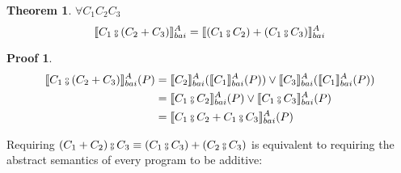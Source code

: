 \documentclass{article}
\newtheorem{theorem}{Theorem}
\newtheorem{proofs}{Proof}
\newcommand*{\sem}[1]{
    \llbracket #1 \rrbracket
}
\newcommand{\bca}[2]{
    #2_{bai}^{#1}
}
\newcommand{\bsem}[2][A]{
    \bca{#1}{\sem{#2}}
}
\def\fcmp{\mathbin{\raise 0.6ex\hbox{\oalign{\hfil$\scriptscriptstyle      
    \mathrm{o}$\hfil\cr\hfil$\scriptscriptstyle\mathrm{9}$\hfil}}}}
\begin{document}
    \begin{theorem}
        $\forall C_1 C_2 C_3$
        $$\bsem{C_1 \fcmp (C_2 + C_3)} = \bsem{(C_1 \fcmp C_2) + (C_1 \fcmp C_3)}$$
    \end{theorem}
    \begin{proofs}
        \begin{align*}
            \bsem{C_1 \fcmp (C_2 + C_3)}(P)
                &= \bsem{C_2}(\bsem{C_1}(P)) \lor \bsem{C_3}(\bsem{C_1}(P)) \\
                &= \bsem{C_1 \fcmp C_2}(P) \lor \bsem{C_1 \fcmp C_3}(P) \\
                &= \bsem{C_1 \fcmp C_2 + C_1 \fcmp C_3}(P) 
        \end{align*}
    \end{proofs}

    Requiring $(C_1 + C_2) \fcmp C_3 \equiv (C_1 \fcmp C_3) 
    + (C_2 \fcmp C_3)$ is equivalent to requiring the abstract semantics
    of every program to be additive:
\end{document}
